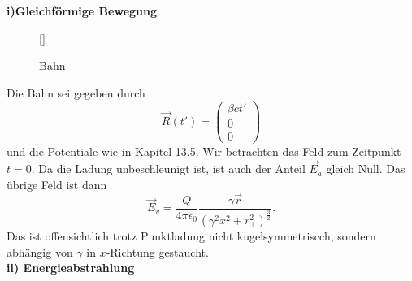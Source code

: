 \textbf{i)\quad Gleichförmige Bewegung}\\


\begin{wrapfigure}[10]{r}[0cm]{0cm}
	\raisebox{0pt}[\dimexpr{}\baselineskip\relax]{
		\colorbox{hgrey}{
		}
	}
	\caption{Bahn}
\end{wrapfigure}
Die Bahn sei gegeben durch
\begin{equation*}
\vec{R}(t')=\begin{pmatrix}
\beta ct' \\ 0 \\ 0
\end{pmatrix}
\end{equation*}
und die Potentiale wie in Kapitel 13.5. Wir betrachten das Feld zum Zeitpunkt $t=0$. Da die Ladung unbeschleunigt ist, ist auch der Anteil $\vec{E}_a$ gleich Null. Das übrige Feld ist dann
\begin{equation*}
\vec{E}_v = \frac{Q}{4\pi\epsilon_0}\frac{\gamma\vec{r}}{(\gamma^2x^2+r_\perp^2)^\frac{3}{2}}.
\end{equation*}
Das ist offensichtlich trotz Punktladung nicht kugelsymmetriscch, sondern abhängig von $\gamma$ in $x$-Richtung gestaucht.\\

\textbf{ii) \quad Energieabstrahlung}\\

